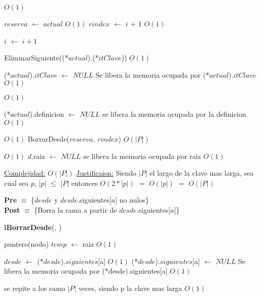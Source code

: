 \begin{Algoritmos}
\begin{algorithm}[H]
\begin{algorithmic}[1]
	 \Comment $O(1)$

	\State $reserva$ $\gets$ $actual$ \Comment $O(1)$
	\State $rindex$ $\gets$ $i$ $+$ 1 \Comment $O(1)$
	
	\EndIf

	\State $i$ $\gets$ $i + 1$
\EndWhile 


\State EliminarSiguiente((*$actual$).(*$itClave$)) \Comment $O(1)$

\State (*$actual$).$itClave$ $\gets$ $NULL$ \Comment Se libera la memoria ocupada por (*$actual$).$itClave$ $O(1)$

 \Comment $O(1)$

	\State (*$actual$).definicion $\gets$ $NULL$ \Comment se libera la memoria ocupada por la definicion $O(1)$

\EndIf 

 \Comment $O(1)$
	\State BorrarDesde($reserva$, $rindex$) \Comment $O(|P|)$
\EndIf 


 \Comment $O(1)$
	\State $d$.raiz $\gets$ $NULL$ \Comment se libera la memoria ocupada por raiz $O(1)$
\EndIf 


\medskip
\State \underline{Complejidad:} $O(|P|)$
\State \underline{Justificaion:} Siendo $|P|$ el largo de la clave mas larga, sea cual sea $p$, $|p|$ $\leq$ $|P|$ entonces $O(2*|p|)$ $=$	$O(|p|)$ $=$ $O(|P|)$

\end{algorithmic}
\end{algorithm}
  
\pagebreak
  
\textbf{Pre} $\equiv$ \{$desde$ y $desde$.siguientes[$a$] no nulos\}\\%
\textbf{Post} $\equiv$ \{Borra la rama a partir de $desde$.siguientes[$a$]\}%

 
\begin{algorithm}[H]
{\textbf{iBorrarDesde}(}, )
\begin{algorithmic}[1]

\State puntero(nodo) $temp$ $\gets$ raiz \Comment $O(1)$

\State $desde$ $\gets$ (*$desde$).$siguientes$[a] \Comment $O(1)$
\State (*$desde$).$siguientes$[a] $\gets$ $NULL$ \Comment Se libera la memoria ocupada por (*desde).siguientes[a] $O(1)$

 \Comment se repite a los sumo $|P|$ veces, siendo p la clave mas larga $O(1)$


\end{algorithmic}
\end{algorithm}
\end{Algoritmos}
